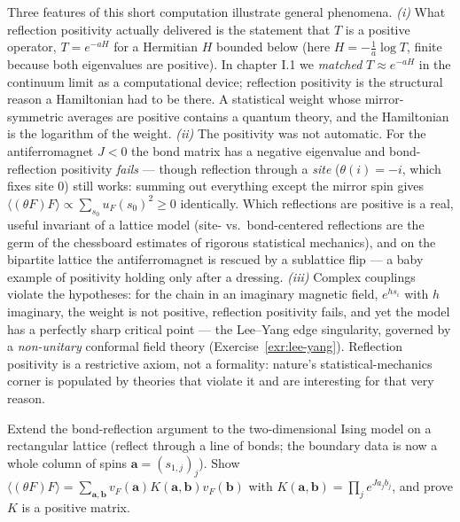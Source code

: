 \begin{eexample}
Three features of this short computation illustrate general phenomena.
\emph{(i)} What reflection positivity actually delivered is the statement that
$T$ is a positive operator, $T = e^{-aH}$ for a Hermitian $H$ bounded below
(here $H = -\frac1a \log T$, finite because both eigenvalues are positive). In
chapter I.1 we \emph{matched} $T \approx e^{-aH}$ in the continuum limit as a
computational device; reflection positivity is the structural reason a
Hamiltonian had to be there. A statistical weight whose mirror-symmetric
averages are positive contains a quantum theory, and the Hamiltonian is the
logarithm of the weight.
\emph{(ii)} The positivity was not automatic. For the antiferromagnet $J < 0$
the bond matrix has a negative eigenvalue and bond-reflection positivity
\emph{fails} --- though reflection through a \emph{site} ($\theta(i) = -i$,
which fixes site $0$) still works: summing out everything except the mirror
spin gives $\langle(\theta F) F\rangle \propto \sum_{s_0} u_F(s_0)^2 \ge 0$
identically. Which reflections are positive is a real, useful invariant of a
lattice model (site- vs.\ bond-centered reflections are the germ of the
chessboard estimates of rigorous statistical mechanics), and on the bipartite
lattice the antiferromagnet is rescued by a sublattice flip --- a baby example
of positivity holding only after a dressing.
\emph{(iii)} Complex couplings violate the hypotheses: for the chain in an imaginary
magnetic field, $e^{h s_i}$ with $h$ imaginary, the weight is not positive,
reflection positivity fails, and yet the model has a perfectly sharp critical
point --- the Lee--Yang edge singularity, governed by a \emph{non-unitary}
conformal field theory (Exercise~\ref{exr:lee-yang}). Reflection positivity is
a restrictive axiom, not a formality: nature's statistical-mechanics corner is
populated by theories that violate it and are interesting for that very reason.
\end{eexample}

\begin{exercise}[easy]
\label{exr:rp-2d-ising}
Extend the bond-reflection argument to the two-dimensional Ising model on a
rectangular lattice (reflect through a line of bonds; the boundary data is now
a whole column of spins $\mathbf{a} = (s_{1,j})_j$). Show $\langle (\theta F) F
\rangle = \sum_{\mathbf{a}, \mathbf{b}} v_F(\mathbf{a}) K(\mathbf{a}, \mathbf{b}) v_F(\mathbf{b})$
with $K(\mathbf{a}, \mathbf{b}) = \prod_j e^{J a_j b_j}$, and prove $K$ is a positive
matrix.
\end{exercise}

